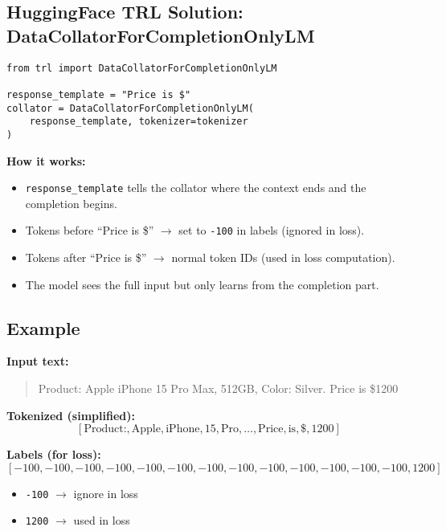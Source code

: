 \documentclass[a4paper, 12pt]{article}
\begin{document}
\subsection*{HuggingFace TRL Solution: DataCollatorForCompletionOnlyLM}

\begin{tcolorbox}[colback=blue!5!white,colframe=blue!75!black,title=Usage]
\begin{verbatim}
from trl import DataCollatorForCompletionOnlyLM

response_template = "Price is $"
collator = DataCollatorForCompletionOnlyLM(
    response_template, tokenizer=tokenizer
)
\end{verbatim}
\end{tcolorbox}

\textbf{How it works:}
\begin{itemize}
    \item \texttt{response\_template} tells the collator where the context ends and the completion begins.
    \item Tokens before ``Price is \$'' $\rightarrow$ set to \texttt{-100} in labels (ignored in loss).
    \item Tokens after ``Price is \$'' $\rightarrow$ normal token IDs (used in loss computation).
    \item The model sees the full input but only learns from the completion part.
\end{itemize}

\subsection*{Example}

\textbf{Input text:}  
\begin{quote}
Product: Apple iPhone 15 Pro Max, 512GB, Color: Silver. Price is \$1200
\end{quote}

\textbf{Tokenized (simplified):}  
\[
[\text{Product:}, \text{Apple}, \text{iPhone}, 15, \text{Pro}, \dots, \text{Price}, \text{is}, \$, 1200]
\]

\textbf{Labels (for loss):}  
\[
[-100, -100, -100, -100, -100, -100, -100, -100, -100, -100, -100, -100, -100, 1200]
\]

\begin{itemize}
    \item \texttt{-100} $\rightarrow$ ignore in loss
    \item \texttt{1200} $\rightarrow$ used in loss
\end{itemize}
\end{document}
